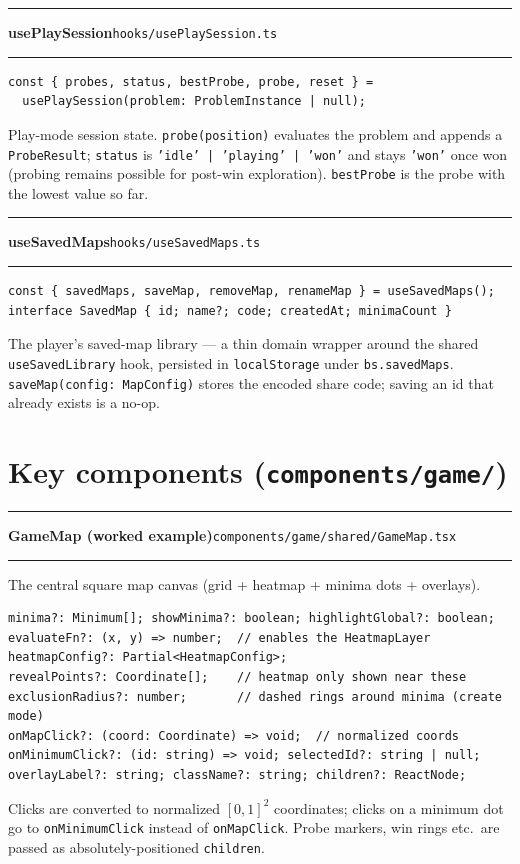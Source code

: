 \documentclass[11pt,a4paper]{report}
\newcommand{\srcfile}[1]{\texttt{\small #1}}   %
\newcommand{\ts}[1]{\texttt{#1}}               %
\newenvironment{apientry}[2]{%
  \par\medskip\noindent
  \begin{minipage}{\textwidth}
  \hrule\vspace{0.6ex}
  {\large\ttfamily\bfseries #1}\hfill{\footnotesize\srcfile{#2}}
  \vspace{0.4ex}\hrule\medskip
}{%
  \end{minipage}\par\medskip
}
\begin{document}
\begin{apientry}{usePlaySession}{hooks/usePlaySession.ts}
\begin{lstlisting}
const { probes, status, bestProbe, probe, reset } =
  usePlaySession(problem: ProblemInstance | null);
\end{lstlisting}
Play-mode session state. \ts{probe(position)} evaluates the problem and
appends a \ts{ProbeResult}; \ts{status} is
\ts{'idle' | 'playing' | 'won'} and stays \ts{'won'} once won (probing
remains possible for post-win exploration). \ts{bestProbe} is the probe
with the lowest value so far.
\end{apientry}

\begin{apientry}{useSavedMaps}{hooks/useSavedMaps.ts}
\begin{lstlisting}
const { savedMaps, saveMap, removeMap, renameMap } = useSavedMaps();
interface SavedMap { id; name?; code; createdAt; minimaCount }
\end{lstlisting}
The player's saved-map library --- a thin domain wrapper around the
shared \ts{useSavedLibrary} hook, persisted in \ts{localStorage} under
\ts{bs.savedMaps}. \ts{saveMap(config: MapConfig)} stores the encoded
share code; saving an id that already exists is a no-op.
\end{apientry}

\section{Key components (\srcfile{components/game/})}

\begin{apientry}{GameMap (worked example)}{components/game/shared/GameMap.tsx}
The central square map canvas (grid + heatmap + minima dots + overlays).
\begin{lstlisting}
minima?: Minimum[]; showMinima?: boolean; highlightGlobal?: boolean;
evaluateFn?: (x, y) => number;  // enables the HeatmapLayer
heatmapConfig?: Partial<HeatmapConfig>;
revealPoints?: Coordinate[];    // heatmap only shown near these
exclusionRadius?: number;       // dashed rings around minima (create mode)
onMapClick?: (coord: Coordinate) => void;  // normalized coords
onMinimumClick?: (id: string) => void; selectedId?: string | null;
overlayLabel?: string; className?: string; children?: ReactNode;
\end{lstlisting}
Clicks are converted to normalized $[0,1]^2$ coordinates; clicks on a
minimum dot go to \ts{onMinimumClick} instead of \ts{onMapClick}. Probe
markers, win rings etc.\ are passed as absolutely-positioned
\ts{children}.
\end{apientry}
\end{document}
